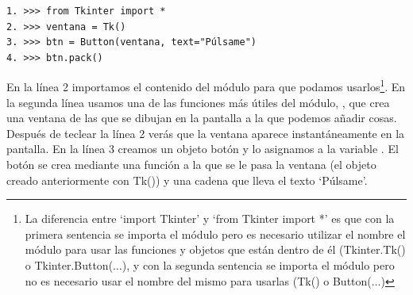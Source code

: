 \begin{listing}
\begin{verbatim}
1. >>> from Tkinter import *
2. >>> ventana = Tk()
3. >>> btn = Button(ventana, text="Púlsame")
4. >>> btn.pack()
\end{verbatim}
\end{listing}

En la línea 2 importamos el contenido del módulo  para que podamos usarlos\footnote{La diferencia entre `import Tkinter' y `from Tkinter import *' es que con la primera sentencia se importa el módulo pero es necesario utilizar el nombre el módulo para usar las funciones y objetos que están dentro de él (Tkinter.Tk() o Tkinter.Button($\ldots$), y con la segunda sentencia se importa el módulo pero no es necesario usar el nombre del mismo para usarlas (Tk() o Button($\ldots$)}. En la segunda línea usamos una de las funciones más útiles del módulo, , que crea una ventana de las que se dibujan en la pantalla a la que podemos añadir cosas.  Después de teclear la línea 2 verás que la ventana aparece instantáneamente en la pantalla. En la línea 3 creamos un objeto botón y lo asignamos a la variable .  El botón se crea mediante una función a la que se le pasa la ventana (el objeto creado anteriormente con Tk()) y una cadena que lleva el texto `Púlsame'.

\par
{}
\par

